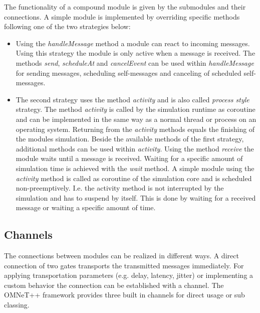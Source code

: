 The functionality of a compound module is given by the submodules and their connections.
A simple module is implemented by overriding specific methods following one of the two strategies below:

\begin{itemize}
    \item Using the \emph{handleMessage} method a module can react to incoming messages.
    Using this strategy the module is only active when a message is received.
    The methods \emph{send}, \emph{scheduleAt} and \emph{cancelEvent} can be used within \emph{handleMessage} for sending messages, scheduling self-messages and canceling of scheduled self-messages. \cite[section 4.4.1]{omnet_manual}
    
    \item The second strategy uses the method \emph{activity} and is also called \emph{process style} strategy.
    The method \emph{activity} is called by the simulation runtime as coroutine and can be implemented in the same way as a normal thread or process on an operating system.
    Returning from the \emph{activity} methods equals the finishing of the modules simulation.
    Beside the available methods of the first strategy, additional methods can be used within \emph{activity}.
    Using the method \emph{receive} the module waits until a message is received.
    Waiting for a specific amount of simulation time is achieved with the \emph{wait} method.
    A simple module using the \emph{activity} method is called as coroutine of the simulation core and is scheduled non-preemptively.
    I.e. the activity method is not interrupted by the simulation and has to suspend by itself.
    This is done by waiting for a received message or waiting a specific amount of time. \cite[section 4.4.2]{omnet_manual}
\end{itemize}

\subsection{Channels}
\label{sec:omnet_components_channels}
The connections between modules can be realized in different ways.
A direct connection of two gates transports the transmitted messages immediately.
For applying transportation parameters (e.g. delay, latency, jitter) or implementing a custom behavior the connection can be established with a channel.
The OMNeT++ framework provides three built in channels for direct usage or sub classing.


